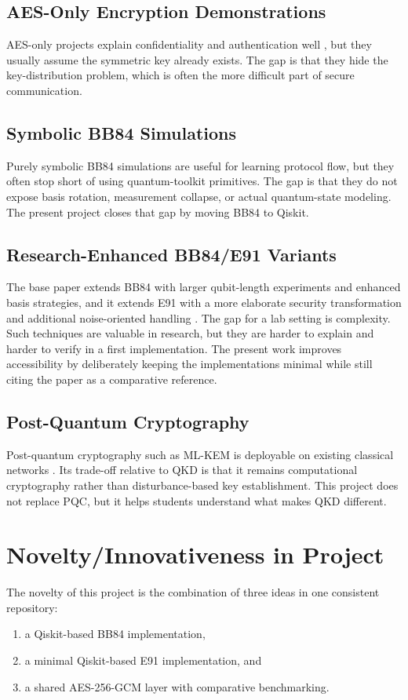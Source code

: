 \documentclass[conference]{IEEEtran}
\begin{document}
\subsection{AES-Only Encryption Demonstrations}
AES-only projects explain confidentiality and authentication well \cite{nist197,nist38d}, but they usually assume the symmetric key already exists. The gap is that they hide the key-distribution problem, which is often the more difficult part of secure communication.

\subsection{Symbolic BB84 Simulations}
Purely symbolic BB84 simulations are useful for learning protocol flow, but they often stop short of using quantum-toolkit primitives. The gap is that they do not expose basis rotation, measurement collapse, or actual quantum-state modeling. The present project closes that gap by moving BB84 to Qiskit.

\subsection{Research-Enhanced BB84/E91 Variants}
The base paper extends BB84 with larger qubit-length experiments and enhanced basis strategies, and it extends E91 with a more elaborate security transformation and additional noise-oriented handling \cite{ain2025novel}. The gap for a lab setting is complexity. Such techniques are valuable in research, but they are harder to explain and harder to verify in a first implementation. The present work improves accessibility by deliberately keeping the implementations minimal while still citing the paper as a comparative reference.

\subsection{Post-Quantum Cryptography}
Post-quantum cryptography such as ML-KEM is deployable on existing classical networks \cite{nist203}. Its trade-off relative to QKD is that it remains computational cryptography rather than disturbance-based key establishment. This project does not replace PQC, but it helps students understand what makes QKD different.

\section{Novelty/Innovativeness in Project}
The novelty of this project is the combination of three ideas in one consistent repository:
\begin{enumerate}
\item a Qiskit-based BB84 implementation,
\item a minimal Qiskit-based E91 implementation, and
\item a shared AES-256-GCM layer with comparative benchmarking.
\end{enumerate}
\end{document}
